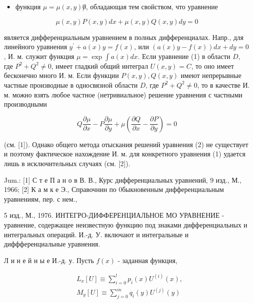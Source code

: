 \documentclass[10pt]{article}
\begin{document}
\begin{itemize}

  \item функция $\mu=\mu(x, y) \not 0$, обладающая тем свойством, что уравнение

\end{itemize}



\[

\mu(x, y) P(x, y) d x+\mu(x, y) Q(x, y) d y=0

\]



является дифференциальным уравнением в полных дифференциалах. Напр., для линейного уравнения $y^{\prime}+a(x) y=f(x)$, или $(a(x) y-f(x)) d x+d y=0$, И. м. служит функция $\mu=\exp \int a(x) d x$. Если уравнение (1) в области $D$, где $P^{2}+Q^{2} \neq 0$, имеет гладкий общий интеграл $U(x, y)=C$, то оно имеет бесконечно много И. м. Если функции $P(x, y), Q(x, y)$ имеют непрерывные частные производные в односвязной области $D$, где $P^{2}+Q^{2} \neq 0$, то в качестве И. м. можно взять любое частное (нетривиальное) решение уравнения с частными производными



\[

Q \frac{\partial \mu}{\partial x}-P \frac{\partial \mu}{\partial y}+\mu\left(\frac{\partial Q}{\partial x}-\frac{\partial P}{\partial y}\right)=0

\]



(см. [1]). Однако общего метода отыскания решений уравнения (2) не существует и поэтому фактическое нахождение И. м. для конкретного уравнения (1) удается лишь в исключительных случаях (см. [2]).



Jum.: [1] С т е П а н о в В. В., Курс дифференциальных уравнений, 9 изд., М., 1966; [2] К а м к е Э., Справочнин по 0быкновенным дифференциальным уравнениям, пер. с нем.,

5 изд., М., 1976. ИНТЕГРО-ДИФФЕРЕНЦИАЛЬНОЕ МО УРАВНЕНИЕ - уравнение, содержащее неизвестную функцию под знаками дифференциальных и интегральных операций. И.-д. У. включают и интегральные и диффференциальные уравнения.



Л и н е й н ы е И.-д. у. Пусть $f(x)$ - заданная функция,



\[

\begin{aligned}

& L_{x}[U] \equiv \sum_{i=0}^{l} p_{i}(x) U^{(i)}(x), \\

& M_{y}[U] \equiv \sum_{j=0}^{m} q_{i}(y) U^{(j)}(y)

\end{aligned}

\]
\end{document}
